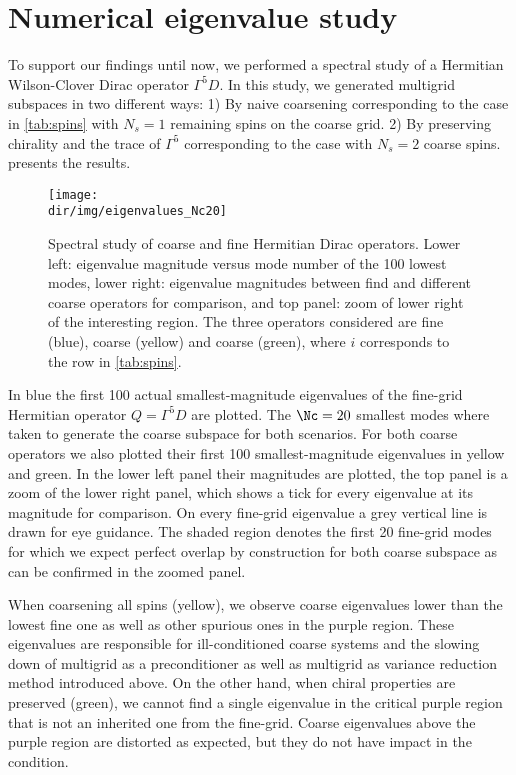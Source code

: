 \section{Numerical eigenvalue study}

To support our findings until now, we performed a spectral study of a Hermitian Wilson-Clover Dirac operator $\Gamma^{5} D$.
In this study, we generated multigrid subspaces in two different ways:
1) By naive coarsening corresponding to the  case in \cref{tab:spins} with $N_s=1$ remaining spins on the coarse grid.
2) By preserving chirality and the trace of $\Gamma^{5}$ corresponding to the  case with $N_s=2$ coarse spins.
 presents the results.

\begin{figure}
\centering
\texttt{[image: \\dir/img/eigenvalues\_Nc20]}
\caption{
Spectral study of coarse and fine Hermitian Dirac operators.
Lower left: eigenvalue magnitude versus mode number of the \num{100} lowest modes, lower right: eigenvalue magnitudes between find and different coarse operators for comparison, and top panel: zoom of lower right of the interesting region.
The three operators considered are fine (blue), coarse  (yellow) and coarse  (green), where $i$ corresponds to the row in \cref{tab:spins}.
\takenfull
}
\label{fig:chirality:spectrum}
\end{figure}

In blue the first \num{100} actual smallest-magnitude eigenvalues of the fine-grid Hermitian operator $Q = \Gamma^5 D$ are plotted.
The $\Nc=20$ smallest modes where taken to generate the coarse subspace for both scenarios.
For both coarse operators we also plotted their first \num{100} smallest-magnitude eigenvalues in yellow and green.
In the lower left panel their magnitudes are plotted, the top panel is a zoom of the lower right panel, which shows a tick for every eigenvalue at its magnitude for comparison.
On every fine-grid eigenvalue a grey vertical line is drawn for eye guidance.
The shaded region denotes the first \num{20} fine-grid modes for which we expect perfect overlap by construction for both coarse subspace as can be confirmed in the zoomed panel.

When coarsening all spins (yellow), we observe coarse eigenvalues lower than the lowest fine one as well as other spurious ones in the purple region.
These eigenvalues are responsible for ill-conditioned coarse systems and the slowing down of multigrid as a preconditioner as well as multigrid as variance reduction method introduced above.
On the other hand, when chiral properties are preserved (green), we cannot find a single eigenvalue in the critical purple region that is not an inherited one from the fine-grid.
Coarse eigenvalues above the purple region are distorted as expected, but they do not have impact in the condition.

